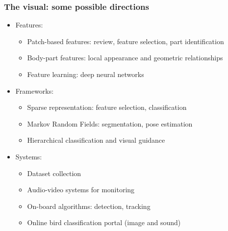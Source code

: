 \documentclass[mathserif]{beamer}
\begin{document}
\begin{frame}
\frametitle{The visual: some possible directions}
\begin{itemize}
\item<2-> Features: 
\begin{itemize}
\item Patch-based features: review, feature selection, part identification
\item Body-part features: local appearance and geometric relationships
\item Feature learning: deep neural networks
\end{itemize}
\item<3-> Frameworks:
\begin{itemize}
\item Sparse representation: feature selection, classification
\item Markov Random Fields: segmentation, pose estimation
\item Hierarchical classification and visual guidance
\end{itemize}
\item<4-> Systems:
\begin{itemize}
\item Dataset collection
\item Audio-video systems for monitoring
\item On-board algorithms: detection, tracking
\item Online bird classification portal (image and sound)
\end{itemize}
\end{itemize}
\end{frame}
\end{document}

